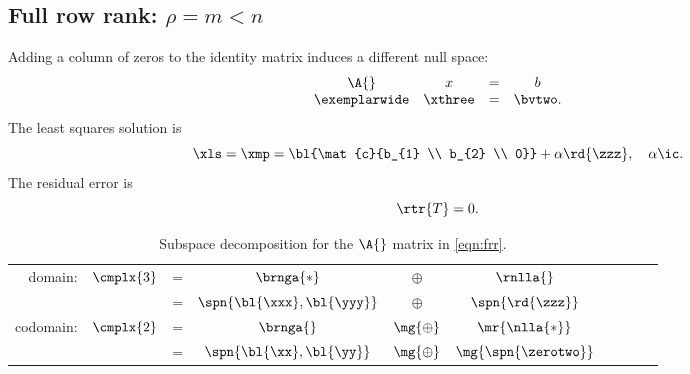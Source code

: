 \clearpage  %

\subsection{Full row rank: $\rho = m < n$}  %
Adding a column of zeros to the identity matrix induces a different null space:
  \begin{equation}
    \begin{array}{cccc}
      \A{} & x & = & b \\
      \exemplarwide & \xthree & = & \bvtwo.
    \label{eqn:frr}
    \end{array}
  \end{equation}
The least squares solution is
  \begin{equation*}   %
      \xls = \xmp = \bl{\mat{c}{b_{1} \\ b_{2} \\ 0}} + \alpha \rd{\zzz}, \quad \alpha \ic.
  \end{equation*}
The residual error is
  \begin{equation*}   %
      \rtr{T} = 0 .
  \end{equation*}

    \begin{table}[h!]
    	\caption[Subspace decomposition for \eqref{eqn:frr}]{Subspace decomposition for the $\A{}$ matrix in \eqref{eqn:frr}.}
    	\begin{center}
    		\begin{tabular}{rccccccccc}
    		  domain: & $\cmplx{3}$ & = & $\brnga{*}$ & $\oplus$ & $\rnlla{}$ \\ 
		                           && = & $\spn{\bl{\xxx},\bl{\yyy}}$ & $\oplus$ & $\spn{\rd{\zzz}}$ \\[19pt]
    		  codomain: & $\cmplx{2}$ & = & $\brnga{}$ & $\mg{\oplus}$ & $\mr{\nlla{*}}$ \\
		                             && = & $\spn{\bl{\xx},\bl{\yy}}$ & $\mg{\oplus}$ & $\mg{\spn{\zerotwo}}$
    		\end{tabular}
    	\end{center}
    \end{table}%

